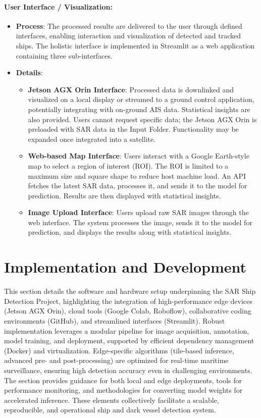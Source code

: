 \documentclass{article}
\begin{document}
\paragraph{User Interface / Visualization:}
\begin{itemize}
	\item \textbf{Process}: The processed results are delivered to the user through defined interfaces, enabling interaction and visualization of detected and tracked ships. The holistic interface is implemented in Streamlit as a web application containing three sub-interfaces.
	
	\item \textbf{Details}:
	\begin{itemize}
		\item \textbf{Jetson AGX Orin Interface}: Processed data is downlinked and visualized on a local display or streamed to a ground control application, potentially integrating with on-ground AIS data. Statistical insights are also provided. Users cannot request specific data; the Jetson AGX Orin is preloaded with SAR data in the Input Folder. Functionality may be expanded once integrated into a satellite.
		
		\item \textbf{Web-based Map Interface}: Users interact with a Google Earth-style map to select a region of interest (ROI). The ROI is limited to a maximum size and square shape to reduce host machine load. An API fetches the latest SAR data, processes it, and sends it to the model for prediction. Results are then displayed with statistical insights.
		
		\item \textbf{Image Upload Interface}: Users upload raw SAR images through the web interface. The system processes the image, sends it to the model for prediction, and displays the results along with statistical insights.
	\end{itemize}
\end{itemize}

	\newpage
	\section{Implementation and Development}
	This section details the software and hardware setup underpinning the SAR Ship Detection Project, highlighting the integration of high-performance edge devices (Jetson AGX Orin), cloud tools (Google Colab, Roboflow), collaborative coding environments (GitHub), and streamlined interfaces (Streamlit). Robust implementation leverages a modular pipeline for image acquisition, annotation, model training, and deployment, supported by efficient dependency management (Docker) and virtualization. Edge-specific algorithms (tile-based inference, advanced pre- and post-processing) are optimized for real-time maritime surveillance, ensuring high detection accuracy even in challenging environments. The section provides guidance for both local and edge deployments, tools for performance monitoring, and methodologies for converting model weights for accelerated inference. These elements collectively facilitate a scalable, reproducible, and operational ship and dark vessel detection system.
\end{document}
